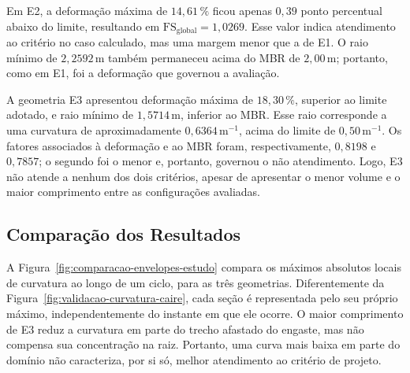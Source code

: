\documentclass[arial,centeredequations,english,brazilian,oneside,section=TITLE]{ifes8}
\begin{document}
Em E2, a deformação máxima de $14{,}61\,\%$ ficou apenas
$0{,}39$ ponto percentual abaixo do limite, resultando em
$\mathrm{FS}_{\mathrm{global}}=1{,}0269$. Esse valor indica atendimento
ao critério no caso calculado, mas uma margem menor que a de E1. O raio
mínimo de $2{,}2592\,\mathrm{m}$ também permaneceu acima do MBR de
$2{,}00\,\mathrm{m}$; portanto, como em E1, foi a deformação que
governou a avaliação.

A geometria E3 apresentou deformação máxima de $18{,}30\,\%$, superior ao
limite adotado, e raio mínimo de $1{,}5714\,\mathrm{m}$, inferior ao
MBR. Esse raio corresponde a uma curvatura de aproximadamente
$0{,}6364\,\mathrm{m^{-1}}$, acima do limite de
$0{,}50\,\mathrm{m^{-1}}$. Os fatores associados à deformação e ao MBR
foram, respectivamente, $0{,}8198$ e $0{,}7857$; o segundo foi o menor
e, portanto, governou o não atendimento. Logo, E3 não atende a nenhum dos dois
critérios, apesar de apresentar o menor volume e o maior comprimento
entre as configurações avaliadas.

\subsection{Comparação dos Resultados}
\label{sec:comparacao-resultados}

A Figura~\ref{fig:comparacao-envelopes-estudo} compara os máximos
absolutos locais de curvatura ao longo de um ciclo, para as três
geometrias. Diferentemente da
Figura~\ref{fig:validacao-curvatura-caire}, cada seção é representada
pelo seu próprio máximo, independentemente do instante em que ele ocorre.
O maior comprimento de E3 reduz a curvatura em parte do trecho afastado
do engaste, mas não compensa sua concentração na raiz. Portanto, uma
curva mais baixa em parte do domínio não caracteriza, por si só, melhor
atendimento ao critério de projeto.
\end{document}
